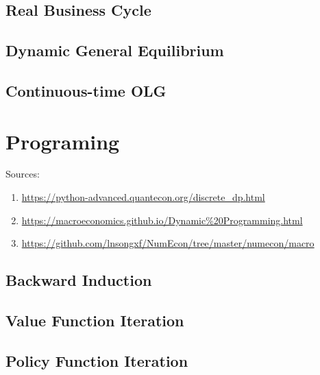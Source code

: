 \documentclass[11pt,a4paper]{book}
\theoremstyle{definition}\newtheorem{definition}{Definition}
\theoremstyle{definition}\newtheorem{fact}{Fact}
\theoremstyle{definition}\newtheorem{remark}{Remark}
\theoremstyle{definition}\newtheorem{ex}{Ex.}
\theoremstyle{definition}\newtheorem{project}{Project}
\theoremstyle{definition}\newtheorem{problem}{Problem}
\theoremstyle{definition}\newtheorem{example}{Example}
\numberwithin{theorem}{section}
\numberwithin{corollary}{chapter}
\numberwithin{assumption}{chapter}
\numberwithin{definition}{chapter}
\numberwithin{prop}{chapter}
\numberwithin{notation}{chapter}
\numberwithin{problem}{chapter}
\numberwithin{example}{chapter}
\numberwithin{fact}{chapter}
\numberwithin{ex}{chapter}
\begin{document}
	\subsection{Real Business Cycle}
	
	\subsection{Dynamic General Equilibrium}
		
	\subsection{Continuous-time OLG}
	
	\section{Programing}
	Sources:
	\begin{enumerate}
		\item \url{https://python-advanced.quantecon.org/discrete_dp.html}
		\item \url{https://macroeconomics.github.io/Dynamic%20Programming.html}
		\item \url{https://github.com/lnsongxf/NumEcon/tree/master/numecon/macro}
	\end{enumerate}
	\subsection{Backward Induction}
	\subsection{Value Function Iteration}
	\subsection{Policy Function Iteration}
	
		

	
	
	
	
\end{document}
